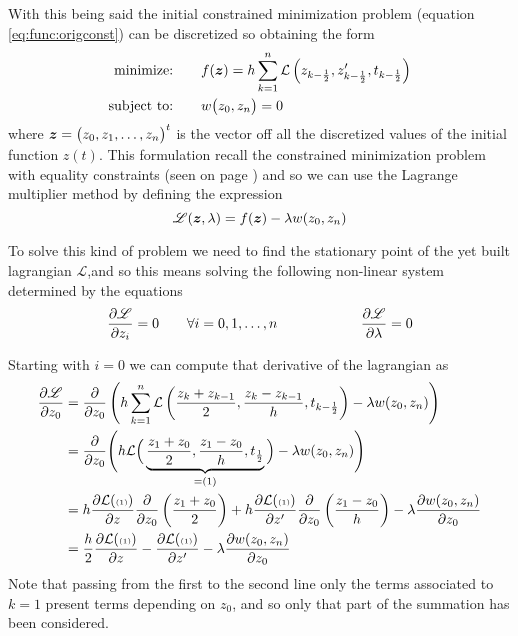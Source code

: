 	With this being said the initial constrained minimization problem (equation \ref{eq:func:origconst}) can be discretized so obtaining the form
	\begin{equation} \label{eq:func:discretized}
		\begin{aligned} 
			\textrm{minimize:}& \qquad f(\boldsymbol{z}) = h \sum_{k=1}^{n} \mathcal L \left( z_{k-\frac 1 2}, z_{k-\frac 1 2}', t_{k-\frac 1 2} \right) \\
			\textrm{subject to:}& \qquad w\big(z_0,z_n \big) = 0
		\end{aligned}
	\end{equation}
	where $\boldsymbol{z} = \big(z_0,z_1,\dots,z_n\big)^t$ is the vector off all the discretized values of the initial function $z(t)$. This formulation recall the constrained minimization problem with equality constraints (seen on page \pageref{sec:min:constrainedmin}) and so we can use the Lagrange multiplier method by defining the expression
	\[ \mathscr L (\boldsymbol{z},\lambda) = f(\boldsymbol{z}) - \lambda w(z_0,z_n) \]
	
	To solve this kind of problem we need to find the stationary point of the yet built lagrangian $\mathscr L$,and so this means solving the following non-linear system determined by the equations
	\[ \frac{\partial \mathscr L}{\partial z_i} = 0 \qquad \forall i = 0,1,\dots,n \qquad \qquad \qquad \frac{\partial \mathscr L}{\partial \lambda} = 0 \]
	
	Starting with $i=0$ we can compute that derivative of the lagrangian as
	\begin{align*}
		\frac{\partial \mathscr L}{\partial z_0} &= \frac{\partial }{\partial z_0} \left(h \sum_{k=1}^{n} \mathcal L \left(\frac{z_k + z_{k-1}}{2},  \frac{z_k - z_{k-1}}{h}  , t_{k-\frac 1 2}   \right) - \lambda w(z_0,z_n) \right) \\
		&= \frac{\partial }{\partial z_0} \Bigg(h \mathcal L \Big(\underbrace{\frac{z_1 + z_0}{2},  \frac{z_1 - z_0}{h}  , t_{\frac 1 2}}_{ = (1) }   \Big) - \lambda w(z_0,z_n) \Bigg) \\
		& = h \frac{\partial \mathcal L({\scriptscriptstyle (1) })}{\partial z} \frac{\partial }{\partial z_0}\left( \frac{z_1 + z_0}{2} \right) + h \frac{\partial \mathcal L({\scriptscriptstyle (1) })}{\partial z'} \frac{\partial }{\partial z_0}\left( \frac{z_1 -  z_0}{h} \right) - \lambda \frac{\partial w(z_0,z_n)}{\partial z_0} \\
		& =  \frac h 2 \frac{\partial \mathcal L({\scriptscriptstyle (1) })}{\partial z} - \frac{\partial \mathcal L({\scriptscriptstyle (1) })}{\partial z'} - \lambda \frac{\partial w(z_0,z_n)}{\partial z_0} \\
	\end{align*}
	Note that passing from the first to the second line only the terms associated to $k=1$ present terms depending on $z_0$, and so only that part of the summation has been considered.
	
